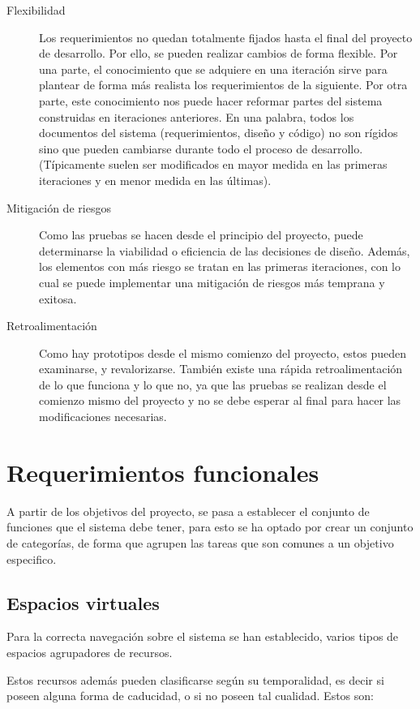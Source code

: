 \begin{description}
\item [Flexibilidad] Los requerimientos no quedan totalmente fijados hasta el
final del proyecto de desarrollo. Por ello, se pueden realizar cambios de forma
flexible. Por una parte, el conocimiento que se adquiere en una iteración sirve
para plantear de forma más realista los requerimientos de la siguiente. Por
otra parte, este conocimiento nos puede hacer reformar partes del sistema
construidas en iteraciones anteriores. En una palabra, todos los documentos del
sistema (requerimientos, diseño y código) no son rígidos sino que pueden
cambiarse durante todo el proceso de desarrollo. (Típicamente suelen ser
modificados en mayor medida en las primeras iteraciones y en menor medida en
las últimas).
\item [Mitigación de riesgos] Como las pruebas se hacen desde el principio del
proyecto, puede determinarse la viabilidad o eficiencia de las decisiones de
diseño. Además, los elementos con más riesgo se tratan en las primeras
iteraciones, con lo cual se puede implementar una mitigación de riesgos más 
temprana y exitosa.
\item [Retroalimentación] Como hay prototipos desde el mismo comienzo del
proyecto, estos pueden examinarse, y revalorizarse. También existe una rápida
retroalimentación de lo que funciona y lo que no, ya que las pruebas se 
realizan desde el comienzo mismo del proyecto y no se debe esperar al final
para hacer las modificaciones necesarias.
\end{description}

\section{Requerimientos funcionales}

A partir de los objetivos del proyecto, se pasa a establecer el conjunto de
funciones que el sistema debe tener, para esto se ha optado por crear un
conjunto de categorías, de forma que agrupen las tareas que son comunes a un
objetivo especifico.

\subsection{Espacios virtuales}

Para la correcta navegación sobre el sistema se han establecido, varios tipos de
espacios agrupadores de recursos.

Estos recursos además pueden clasificarse según su temporalidad, es decir si
poseen alguna forma de caducidad, o si no poseen tal cualidad. Estos son:

